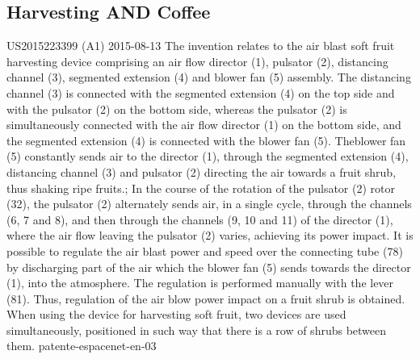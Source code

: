 \subsection{Harvesting AND Coffee}
\label{sec:harvesting-coffee-2}

{US2015223399 (A1)}%
{2015-08-13}%
{The invention relates to the air blast soft fruit harvesting device comprising
  an air flow director (1), pulsator (2), distancing channel (3), segmented
  extension (4) and blower fan (5) assembly. The distancing channel (3) is
  connected with the segmented extension (4) on the top side and with the
  pulsator (2) on the bottom side, whereas the pulsator (2) is simultaneously
  connected with the air flow director (1) on the bottom side, and the segmented
  extension (4) is connected with the blower fan (5). Theblower fan (5)
  constantly sends air to the director (1), through the segmented extension (4),
  distancing channel (3) and pulsator (2) directing the air towards a fruit
  shrub, thus shaking ripe fruits.; In the course of the rotation of the
  pulsator (2) rotor (32), the pulsator (2) alternately sends air, in a single
  cycle, through the channels (6, 7 and 8), and then through the channels (9, 10
  and 11) of the director (1), where the air flow leaving the pulsator (2)
  varies, achieving its power impact. It is possible to regulate the air blast
  power and speed over the connecting tube (78) by discharging part of the air
  which the blower fan (5) sends towards the director (1), into the
  atmosphere. The regulation is performed manually with the lever (81).  Thus,
  regulation of the air blow power impact on a fruit shrub is obtained.  When
  using the device for harvesting soft fruit, two devices are used
  simultaneously, positioned in such way that there is a row of shrubs between
  them.}%
{patente-espacenet-en-03}%





